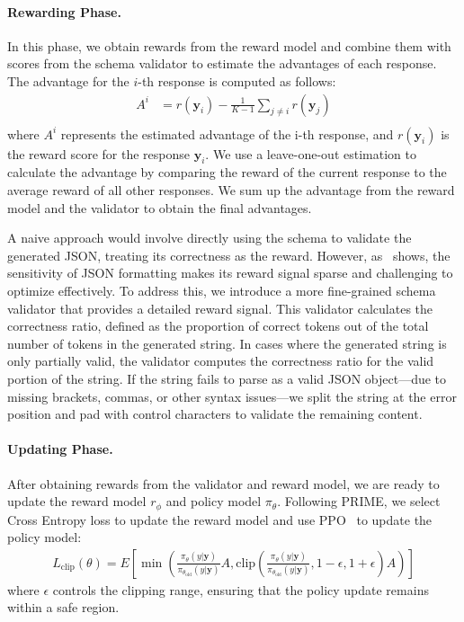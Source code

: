 \paragraph{Rewarding Phase.}
In this phase, we obtain rewards from the reward model and combine them with scores from the schema validator to estimate the advantages of each response.
The advantage for the $i$-th response is computed as follows:
\begin{equation}
\begin{aligned}
A^i &= r(\mathbf{y}_i)-\frac{1}{K-1}\sum_{j\neq i}r(\mathbf{y}_j) \\
\end{aligned}
\end{equation}
where $A^i$ represents the estimated advantage of the i-th response, and $r(\mathbf{y}_i)$ is the reward score for the response $\mathbf{y}_i$. We use a leave-one-out estimation to calculate the advantage by comparing the reward of the current response to the average reward of all other responses.
We sum up the advantage from the reward model and the validator to obtain the final advantages.


A naive approach would involve directly using the schema to validate the generated JSON, treating its correctness as the reward. However, as~ shows, the sensitivity of JSON formatting makes its reward signal sparse and challenging to optimize effectively. 
To address this, we introduce a more fine-grained schema validator that provides a detailed reward signal. This validator calculates the correctness ratio, defined as the proportion of correct tokens out of the total number of tokens in the generated string. In cases where the generated string is only partially valid, the validator computes the correctness ratio for the valid portion of the string. If the string fails to parse as a valid JSON object—due to missing brackets, commas, or other syntax issues—we split the string at the error position and pad with control characters to validate the remaining content.

\paragraph{Updating Phase.}
After obtaining rewards from the validator and reward model, we are ready to update the reward model $r_{\phi}$ and policy model $\pi_\theta$.
Following PRIME, we select Cross Entropy loss to update the reward model and use PPO~\cite {schulman2017proximal} to update the policy model:
\begin{equation}
\begin{aligned}
L_{\text{clip}}(\theta) =E[\min(\frac{\pi_\theta(y|\mathbf{y})}{\pi_{\theta_{\text{old}}}(y|\mathbf{y})}A,
\text{clip}(\frac{\pi_\theta(y|\mathbf{y})}{\pi_{\theta_{\text{old}}}(y|\mathbf{y})},1 -\epsilon,1 + \epsilon)A)] 
\end{aligned}
\end{equation}
where $\epsilon$ controls the clipping range, ensuring that the policy update remains within a safe region. 



